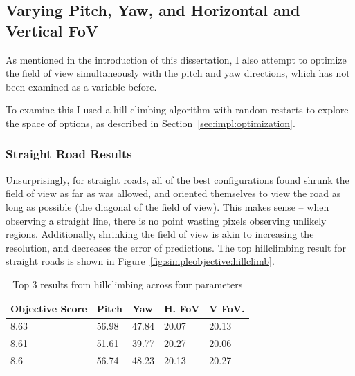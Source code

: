 \documentclass[a4paper,12pt,twoside,openright]{report}
\begin{document}


\subsection{Varying Pitch, Yaw, and Horizontal and Vertical FoV}

As mentioned in the introduction of this dissertation, I also attempt
to optimize the field of view simultaneously with the pitch and yaw
directions, which has not been examined as a variable before.

To examine this I used a hill-climbing algorithm with random restarts
to explore the space of options, as described in Section~\ref{sec:impl:optimization}.

\subsubsection{Straight Road Results}

Unsurprisingly, for straight roads, all of the best configurations found
shrunk the field of view as far as was allowed, and oriented themselves to
view the road as long as possible (the diagonal of the field of view). This makes sense -- 
when observing a straight line, there is no point wasting pixels
observing unlikely regions. Additionally, shrinking the field
of view is akin to increasing the resolution, and decreases
the error of predictions. The top hillclimbing result
for straight roads is shown in Figure~\ref{fig:simpleobjective:hillclimb}.

\begin{table}[htb]
    \centering
    \caption[Hillclimbing Top Scorers]{Top 3 results from hillclimbing across four parameters}
    \label{tab:simpleobjective:hillclimb}
    \begin{tabular}{@{}lllll@{}}
        \toprule
        Objective Score & Pitch & Yaw   & H. FoV & V FoV. \\ \midrule
        8.63            & 56.98 & 47.84 & 20.07  & 20.13  \\
        8.61            & 51.61 & 39.77 & 20.27  & 20.06  \\
        8.6             & 56.74 & 48.23 & 20.13  & 20.27  \\ \bottomrule
    \end{tabular}
\end{table}
\end{document}
